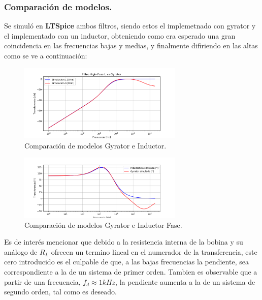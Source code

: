 \documentclass[a4paper]{article}
\begin{document}
\subsubsection{Comparación de modelos.}
Se simuló en \textbf{LTSpice} ambos filtros, siendo estos el implemetnado con gyrator y el implementado con un inductor, obteniendo como era esperado una gran coincidencia en las frecuencias bajas y medias, y finalmente difiriendo en las altas como se ve a continuación:
\begin{figure}[H]	
	\centering
	\includegraphics[width=0.7\textwidth]{ImagenesEj2/simHP.PNG}
	\caption{Comparación de modelos Gyrator e Inductor.}
	\label{fig:gyrInd}
\end{figure}
\begin{figure}[H]	
	\centering
	\includegraphics[width=0.7\textwidth]{ImagenesEj2/simHPP.PNG}
	\caption{Comparación de modelos Gyrator e Inductor Fase.}
	\label{fig:gyrIndP}
\end{figure}
Es de interés mencionar que debido a la resistencia interna de la bobina y su análogo de $R_L$ ofrecen un termino lineal en el numerador de la transferencia, este cero introducido es el culpable de que, a las bajas frecuencias la pendiente, sea correspondiente a la de un sistema de primer orden. Tambien es observable que a partir de una frecuencia, $f_d \approx 1kHz $, la pendiente aumenta a la de un sistema de segundo orden, tal como es deseado.
\end{document}
